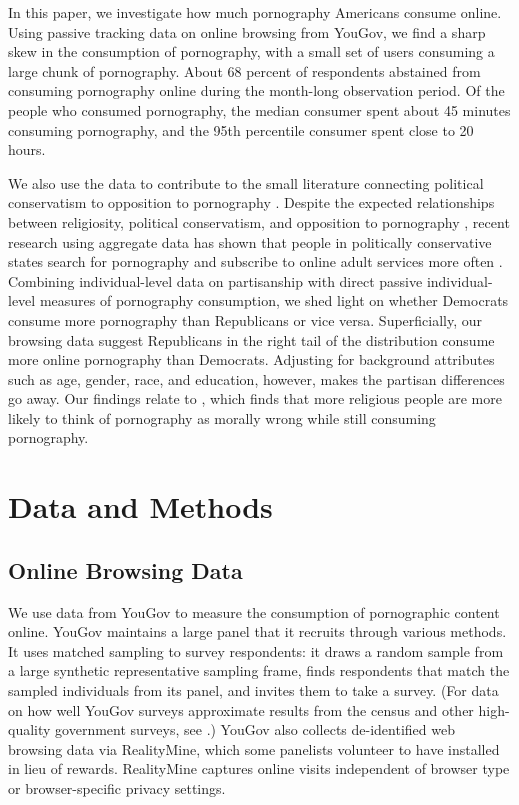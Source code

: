 \documentclass[12pt,twoside]{article}
\begin{document}
In this paper, we investigate how much pornography Americans consume online. Using passive tracking data on online browsing from YouGov, we find a sharp skew in the consumption of pornography, with a small set of users consuming a large chunk of pornography. About 68 percent of respondents abstained from consuming pornography online during the month-long observation period. Of the people who consumed pornography, the median consumer spent about 45 minutes consuming pornography, and the 95th percentile consumer spent close to 20 hours. %

We also use the data to contribute to the small literature connecting political conservatism to opposition to pornography \citep{Peek1982-ua, Woodrum1992-vk}. Despite the expected relationships between religiosity, political conservatism, and opposition to pornography \citep{Wright2013-an, Perry2018-cn}, recent research using aggregate data has shown that people in politically conservative states search for pornography and subscribe to online adult services more often \citep{macinnis2015american, edelman2009markets}. Combining individual-level data on partisanship with direct passive individual-level measures of pornography consumption, we shed light on whether Democrats consume more pornography than Republicans or vice versa. Superficially, our browsing data suggest Republicans in the right tail of the distribution consume more online pornography than Democrats. Adjusting for background attributes such as age, gender, race, and education, however, makes the partisan differences go away. Our findings relate to \cite{Perry2018-cn}, which finds that more religious people are more likely to think of pornography as morally wrong while still consuming pornography. 

\section{Data and Methods}
\label{sec:data}

\subsection{Online Browsing Data}
\label{subsec:online_browse_data}

We use data from YouGov to measure the consumption of pornographic content online. YouGov maintains a large panel that it recruits through various methods. It uses matched sampling to survey respondents: it draws a random sample from a large synthetic representative sampling frame, finds respondents that match the sampled individuals from its panel, and invites them to take a survey. (For data on how well YouGov surveys approximate results from the census and other high-quality government surveys, see \citet{rivers2009, graham2021advantages, foote2021measuring}.) YouGov also collects de-identified web browsing data via RealityMine, which some panelists volunteer to have installed in lieu of rewards. RealityMine captures online visits independent of browser type or browser-specific privacy settings.
\end{document}
